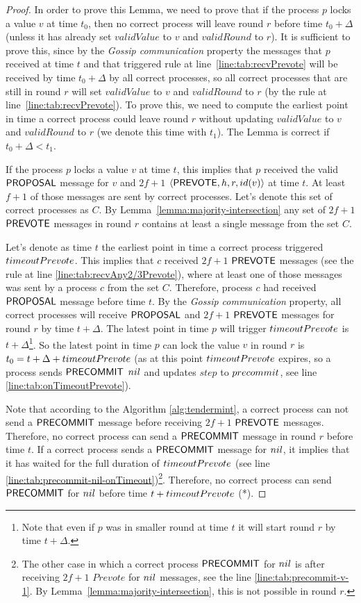 \begin{proof} In order to prove this Lemma, we need to prove that if the
    process $p$ locks a value $v$ at time $t_0$, then no correct process will
    leave round $r$ before time $t_0 + \Delta$ (unless it has already set
    $validValue$ to $v$ and $validRound$ to $r$). It is sufficient to prove
    this, since by the \emph{Gossip communication} property the messages that
    $p$ received at time $t$ and that triggered rule at
    line~\ref{line:tab:recvPrevote} will be received by time $t_0 + \Delta$ by
    all correct processes, so all correct processes that are still in round $r$
    will set $validValue$ to $v$ and $validRound$ to $r$ (by the rule at
    line~\ref{line:tab:recvPrevote}). To prove this, we need to compute the
    earliest point in time a correct process could leave round $r$ without
    updating $validValue$ to $v$ and $validRound$ to $r$ (we denote this time
    with $t_1$). The Lemma is correct if $t_0 + \Delta < t_1$. 

If the process $p$ locks a value $v$ at time $t$, this implies that $p$
received the valid $\mathsf{PROPOSAL}$ message for $v$ and $2f+1$
$\langle\mathsf{PREVOTE},h,r,id(v)\rangle$ at time $t$. At least $f+1$ of those messages are
sent by correct processes. Let's denote this set of correct processes as $C$. By
Lemma~\ref{lemma:majority-intersection} any set of $2f+1$ $\mathsf{PREVOTE}$ messages
in round $r$ contains at least a single message from the set $C$. 

Let's denote as time $t$ the earliest point in time a correct process triggered
$timeoutPrevote$. This implies that $c$ received $2f+1$ $\mathsf{PREVOTE}$ messages
(see the rule at line \ref{line:tab:recvAny2/3Prevote}), where at least one of
those messages was sent by a process $c$ from the set $C$.  Therefore, process
$c$ had received $\mathsf{PROPOSAL}$ message before time $t$. By the \emph{Gossip
communication} property, all correct processes will receive $\mathsf{PROPOSAL}$ and
$2f+1$ $\mathsf{PREVOTE}$ messages for round $r$ by time $t+\Delta$. The latest point
in time $p$ will trigger $timeoutPrevote$ is $t+\Delta$\footnote{Note that
even if $p$ was in smaller round at time $t$ it will start round $r$ by time
$t+\Delta$.}.  So the latest point in time $p$ can lock the value $v$ in
round $r$ is $t_0 = t+\Delta+timeoutPrevote$ (as at this point
$timeoutPrevote$ expires, so a process sends $\mathsf{PRECOMMIT}$ $nil$ and updates
$step$ to $precommit$, see line \ref{line:tab:onTimeoutPrevote}).  

Note that according to the Algorithm \ref{alg:tendermint}, a correct process
can not send a $\mathsf{PRECOMMIT}$ message before receiving $2f+1$ $\mathsf{PREVOTE}$
messages.  Therefore, no correct process can send a $\mathsf{PRECOMMIT}$ message in
round $r$ before time $t$. If a correct process sends a $\mathsf{PRECOMMIT}$ message
for $nil$, it implies that it has waited for the full duration of
$timeoutPrevote$ (see line
\ref{line:tab:precommit-nil-onTimeout})\footnote{The other case in which a
correct process $\mathsf{PRECOMMIT}$ for $nil$ is after receiving $2f+1$ $Prevote$ for
$nil$ messages, see the line \ref{line:tab:precommit-v-1}. By
Lemma~\ref{lemma:majority-intersection}, this is not possible in round $r$.}.
Therefore, no correct process can send $\mathsf{PRECOMMIT}$ for $nil$ before time $t +
timeoutPrevote$ (*).


\end{proof}
